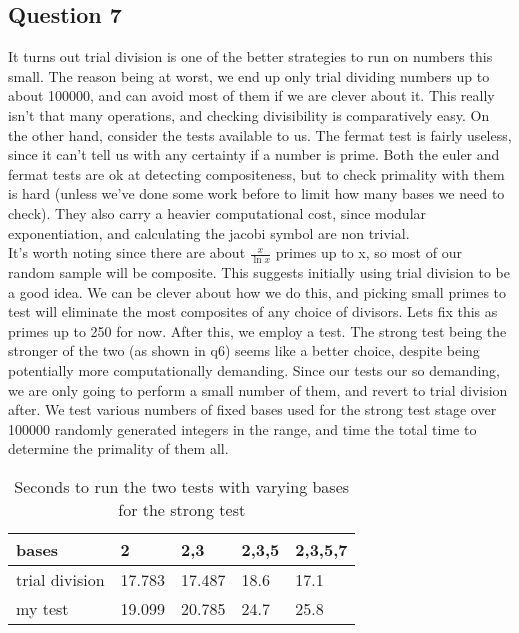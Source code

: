 \documentclass[10pt,a4paper]{report}
\begin{document}
\subsection*{Question 7}
It turns out trial division is one of the better strategies to run on numbers this small. The reason being at worst, we end up only trial dividing numbers up to about 100000, and can avoid most of them if we are clever about it. This really isn't that many operations, and checking divisibility is comparatively easy. On the other hand, consider the tests available to us. The fermat test is fairly useless, since it can't tell us with any certainty if a number is prime. Both the euler and fermat tests are ok at detecting compositeness, but to check primality with them is hard (unless we've done some work before to limit how many bases we need to check). They also carry a heavier computational cost, since modular exponentiation, and calculating the jacobi symbol are non trivial.\\

It's worth noting since there are about $\frac{x}{\ln{x}}$ primes up to x, so most of our random sample will be composite. This suggests initially using trial division to be a good idea. We can be clever about how we do this, and picking small primes to test will eliminate the most composites of any choice of divisors. Lets fix this as primes up to 250 for now. After this, we employ a test. The strong test being the stronger of the two (as shown in q6) seems like a better choice, despite being potentially more computationally demanding. Since our tests our so demanding, we are only going to perform a small number of them, and revert to trial division after. We test various numbers of fixed bases used for the strong test stage over 100000 randomly generated integers in the range, and time the total time to determine the primality of them all.\\

\begin{table}[ht]
\centering
\begin{tabular}{|l|l|l|l|l|}
\hline
    bases           & 2      & 2,3    & 2,3,5 & 2,3,5,7 \\ \hline
trial division & 17.783 & 17.487 & 18.6  & 17.1    \\ \hline
my test        & 19.099 & 20.785 & 24.7  & 25.8    \\ \hline
\end{tabular}
\caption{Seconds to run the two tests with varying bases for the strong test}
\end{table}
\end{document}
